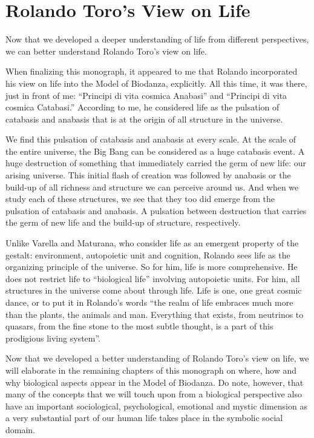 \documentclass[
  11pt,
]{book}
\begin{document}
\hypertarget{rolando-toros-view-on-life}{%
\section{Rolando Toro's View on Life}\label{rolando-toros-view-on-life}}

Now that we developed a deeper understanding of life from different perspectives, we can better understand Rolando Toro's view on life.

When finalizing this monograph, it appeared to me that Rolando incorporated his view on life into the Model of Biodanza, explicitly.
All this time, it was there, just in front of me: ``Principi di vita cosmica Anabasi'' and ``Principi di vita cosmica Catabasi.'' According to me, he considered life as the pulsation of catabasis and anabasis that is at the origin of all structure in the universe.

We find this pulsation of catabasis and anabasis at every scale. At the scale of the entire universe, the Big Bang can be considered as a huge catabasis event. A huge destruction of something that immediately carried the germ of new life: our arising universe. This initial flash of creation was followed by anabasis or the build-up of all richness and structure we can perceive around us. And when we study each of these structures, we see that they too did emerge from the pulsation of catabasis and anabasis. A pulsation between destruction that carries the germ of new life and the build-up of structure, respectively.

Unlike Varella and Maturana, who consider life as an emergent property of the gestalt: environment, autopoietic unit and cognition, Rolando sees life as the organizing principle of the universe. So for him, life is more comprehensive. He does not restrict life to ``biological life'' involving autopoietic units. For him, all structures in the universe come about through life. Life is one, one great cosmic dance, or to put it in Rolando's words ``the realm of life embraces much more than the plants, the animals and man. Everything that exists, from neutrinos to quasars, from the fine stone to the most subtle thought, is a part of this prodigious living system''.

Now that we developed a better understanding of Rolando Toro's view on life, we will elaborate in the remaining chapters of this monograph on where, how and why biological aspects appear in the Model of Biodanza. Do note, however, that many of the concepts that we will touch upon from a biological perspective also have an important sociological, psychological, emotional and mystic dimension as a very substantial part of our human life takes place in the symbolic social domain.
\end{document}
